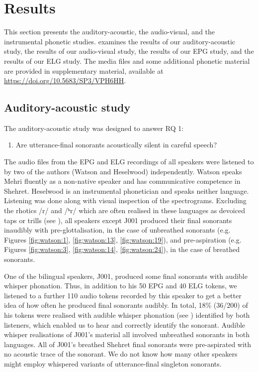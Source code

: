 \documentclass[output=paper]{langscibook}
\begin{document}
\section{Results} %
\label{sec:watson:4}
This section presents the auditory-acoustic, the audio-visual, and the instrumental phonetic studies.  examines the results of our auditory-acoustic study,  the results of our audio-visual study,  the results of our EPG study, and  the results of our ELG study. The media files and some additional phonetic material are provided in supplementary material, available at \url{https://doi.org/10.5683/SP3/VPH6HH}.

\subsection{Auditory-acoustic study}
\label{sec:watson:4.1}
The auditory-acoustic study was designed to answer RQ 1:
\largerpage

\begin{enumerate}
  \item Are utterance-final sonorants acoustically silent in careful speech?
\end{enumerate}

The audio files from the EPG and ELG recordings of all speakers were listened to by two of the authors (Watson and Heselwood) independently. Watson speaks Mehri fluently as a non-native speaker and has communicative competence in Shehret. Heselwood is an instrumental phonetician and speaks neither language. Listening was done along with visual inspection of the spectrograms. Excluding the rhotics \mbox{/r/} and \mbox{/ʰr/} which are often realised in these languages as devoiced taps or trills (see ), all speakers except J001 produced their final sonorants inaudibly with pre-glottalisation, in the case of unbreathed sonorants (e.g. Figures \ref{fig:watson:1}, \ref{fig:watson:13}, \ref{fig:watson:19}), and pre-aspiration (e.g. Figures \ref{fig:watson:3}, \ref{fig:watson:14}, \ref{fig:watson:24}), in the case of breathed sonorants.

One of the bilingual speakers, J001, produced some final sonorants with audible whisper phonation. Thus, in addition to his 50 EPG and 40 ELG tokens, we listened to a further 110 audio tokens recorded by this speaker to get a better idea of how often he produced final sonorants audibly. In total, 18\% (36/200) of his tokens were realised with audible whisper phonation (see ) identified by both listeners, which enabled us to hear and correctly identify the sonorant. Audible whisper realisations of J001’s material all involved unbreathed sonorants in both languages. All of J001’s breathed Shehret final sonorants were pre-aspirated with no acoustic trace of the sonorant. We do not know how many other speakers might employ whispered variants of utterance-final singleton sonorants.
\end{document}
